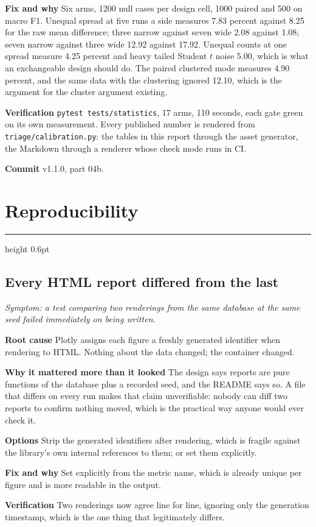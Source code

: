 \documentclass[11pt,a4paper]{article}
\newcommand{\entry}[2]{%
  \vspace{0.6em}%
  {\color{rulegrey}\hrule height 0.6pt}%
  \vspace{0.5em}%
  \subsection*{#1}%
  \textit{\small #2}\par\vspace{0.3em}%
}
\newcommand{\field}[1]{\vspace{0.35em}\textbf{#1}\quad}
\begin{document}
\field{Fix and why} Six arms, 1200 null cases per design cell, 1000 paired and
500 on macro F1. Unequal spread at five runs a side measures 7.83 percent against
8.25 for the raw mean difference; three narrow against seven wide 2.08 against
1.08; seven narrow against three wide 12.92 against 17.92. Unequal counts at one
spread measure 4.25 percent and heavy tailed Student $t$ noise 5.00, which is
what an exchangeable design should do. The paired clustered mode measures 4.90
percent, and the same data with the clustering ignored 12.10, which is the
argument for the cluster argument existing.

\field{Verification} \texttt{pytest tests/statistics}, 17 arms, 110 seconds, each
gate green on its own measurement. Every published number is rendered from
\texttt{triage/calibration.py}: the tables in this report through the asset
generator, the Markdown through a renderer whose check mode runs in CI.

\field{Commit} v1.1.0, part 04b.

\section{Reproducibility}

\entry{Every HTML report differed from the last}{Symptom: a test comparing two
renderings from the same database at the same seed failed immediately on being
written.}

\field{Root cause} Plotly assigns each figure a freshly generated identifier when
rendering to HTML. Nothing about the data changed; the container changed.

\field{Why it mattered more than it looked} The design says reports are pure
functions of the database plus a recorded seed, and the README says so. A file
that differs on every run makes that claim unverifiable: nobody can diff two
reports to confirm nothing moved, which is the practical way anyone would ever
check it.

\field{Options} Strip the generated identifiers after rendering, which is fragile
against the library's own internal references to them; or set them explicitly.

\field{Fix and why} Set explicitly from the metric name, which is already unique
per figure and is more readable in the output.

\field{Verification} Two renderings now agree line for line, ignoring only the
generation timestamp, which is the one thing that legitimately differs.
\end{document}
